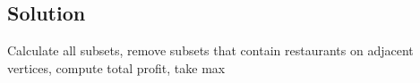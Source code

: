 \subsection*{Solution}

Calculate all subsets, remove subsets that contain restaurants on adjacent vertices, compute total profit, take max
